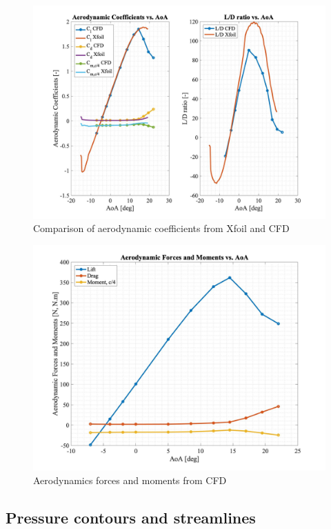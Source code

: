 \begin{figure}[H]
	\centering
	\includegraphics[width=\textwidth]{coeffs.jpg}
	\caption{Comparison of aerodynamic coefficients from Xfoil and CFD}
\label{fig:coeffs}
\end{figure}

\begin{figure}[H]
	\centering
	\includegraphics[width=\textwidth]{forces.jpg}
	\caption{Aerodynamics forces and moments from CFD}
\label{fig:forces}
\end{figure}


\subsection{Pressure contours and streamlines}

